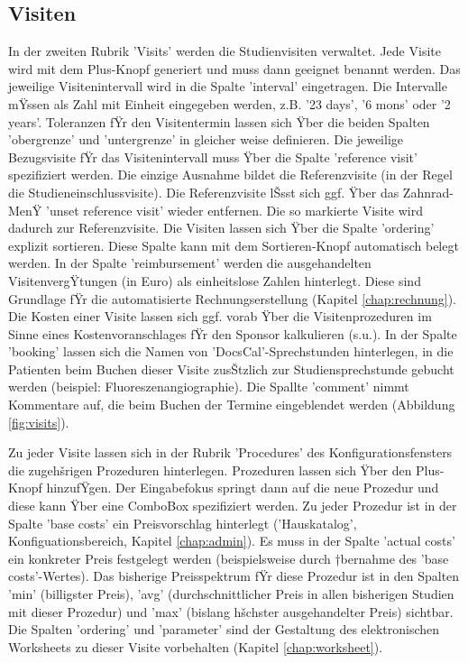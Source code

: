 \documentclass[11pt,oneside]{scrbook}
\begin{document}
\subsection{Visiten}
In der zweiten Rubrik 'Visits' werden die Studienvisiten verwaltet. Jede Visite wird mit dem Plus-Knopf generiert und muss dann geeignet benannt werden. Das jeweilige Visitenintervall wird in die Spalte 'interval' eingetragen. Die Intervalle mŸssen als Zahl mit Einheit eingegeben werden, z.B.  '23 days', '6 mons' oder '2 years'. Toleranzen fŸr den Visitentermin lassen sich Ÿber die beiden  Spalten 'obergrenze' und 'untergrenze' in gleicher weise definieren. Die jeweilige Bezugsvisite fŸr das Visitenintervall muss Ÿber die Spalte 'reference visit' spezifiziert werden. Die einzige Ausnahme bildet die  Referenzvisite (in der Regel die Studieneinschlussvisite). Die Referenzvisite lŠsst sich ggf. Ÿber das Zahnrad-MenŸ 'unset reference visit'  wieder entfernen. Die so markierte Visite wird dadurch  zur Referenzvisite.  Die Visiten lassen sich  Ÿber die Spalte 'ordering' explizit sortieren. Diese Spalte kann mit dem Sortieren-Knopf automatisch belegt werden. In der Spalte 'reimbursement' werden die ausgehandelten VisitenvergŸtungen (in Euro) als einheitslose Zahlen hinterlegt. Diese sind Grundlage fŸr die automatisierte Rechnungserstellung (Kapitel \ref{chap:rechnung}). Die  Kosten einer Visite lassen sich ggf. vorab Ÿber die Visitenprozeduren im Sinne eines Kostenvoranschlages fŸr den Sponsor kalkulieren (s.u.). In der Spalte 'booking' lassen sich die Namen von 'DocsCal'-Sprechstunden hinterlegen, in die Patienten beim Buchen dieser Visite zusŠtzlich zur Studiensprechstunde gebucht werden (beispiel: Fluoreszenangiographie). Die Spallte 'comment' nimmt Kommentare auf, die beim Buchen der Termine eingeblendet werden (Abbildung \ref{fig:visits}).

Zu jeder Visite lassen sich in der Rubrik 'Procedures' des Konfigurationsfensters die zugehšrigen Prozeduren hinterlegen. Prozeduren lassen sich Ÿber den Plus-Knopf hinzufŸgen. Der Eingabefokus springt dann auf die  neue Prozedur und diese kann Ÿber eine ComboBox spezifiziert werden.  Zu jeder Prozedur ist in der Spalte 'base costs' ein Preisvorschlag hinterlegt ('Hauskatalog', Konfiguationsbereich, Kapitel \ref{chap:admin}).  Es muss in der Spalte 'actual costs' ein konkreter Preis festgelegt werden (beispielsweise durch †bernahme des 'base costs'-Wertes). Das bisherige Preisspektrum fŸr diese Prozedur ist in den Spalten 'min' (billigster Preis), 'avg' (durchschnittlicher Preis in allen bisherigen Studien mit dieser Prozedur) und 'max' (bislang hšchster ausgehandelter Preis) sichtbar.
Die Spalten 'ordering' und 'parameter' sind der Gestaltung des elektronischen Worksheets zu dieser Visite vorbehalten (Kapitel \ref{chap:worksheet}). %
\end{document}

